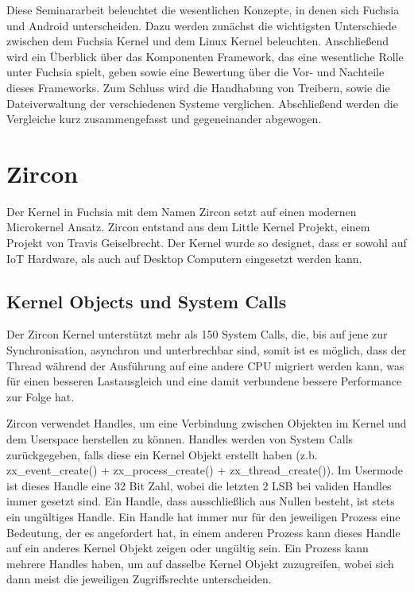 \documentclass[a4paper]{scrartcl}
\begin{document}
Diese Seminararbeit beleuchtet die wesentlichen Konzepte, in denen sich Fuchsia und Android unterscheiden. Dazu werden zunächst die wichtigsten Unterschiede zwischen dem Fuchsia Kernel und dem Linux Kernel beleuchten. Anschließend wird ein Überblick über das Komponenten Framework, das eine wesentliche Rolle unter Fuchsia spielt, geben sowie eine Bewertung über die Vor- und Nachteile dieses Frameworks. Zum Schluss wird die Handhabung von Treibern, sowie die Dateiverwaltung der verschiedenen Systeme verglichen. Abschließend werden die Vergleiche kurz zusammengefasst und gegeneinander abgewogen.
\section{Zircon}
Der Kernel in Fuchsia mit dem Namen Zircon setzt auf einen modernen Microkernel Ansatz. Zircon entstand aus dem Little Kernel Projekt, einem Projekt von Travis Geiselbrecht. Der Kernel wurde so designet, dass er sowohl auf IoT Hardware, als auch auf Desktop Computern eingesetzt werden kann. \cite{DaveAltavilla.30.Juni2019}
\subsection{Kernel Objects und System Calls}
Der Zircon Kernel unterstützt mehr als 150 System Calls, die, bis auf jene zur Synchronisation, asynchron und unterbrechbar sind, \cite{Fuchsia.Zircon.Systemcalls} somit ist es möglich, dass der Thread während der Ausführung auf eine andere CPU migriert werden kann, was für einen besseren Lastausgleich und eine damit verbundene bessere Performance zur Folge hat.

Zircon verwendet Handles, um eine Verbindung zwischen Objekten im Kernel und dem Userspace herstellen zu können. Handles werden von System Calls zurückgegeben, falls diese ein Kernel Objekt erstellt haben (z.b. zx\_event\_create() + zx\_process\_create() + zx\_thread\_create()). Im Usermode ist dieses Handle eine 32 Bit Zahl, wobei die letzten 2 LSB bei validen Handles immer gesetzt sind. Ein Handle, dass ausschließlich aus Nullen besteht, ist stets ein ungültiges Handle. Ein Handle hat immer nur für den jeweiligen Prozess eine Bedeutung, der es angefordert hat, in einem anderen Prozess kann dieses Handle auf ein anderes Kernel Objekt zeigen oder ungültig sein. Ein Prozess kann mehrere Handles haben, um auf dasselbe Kernel Objekt zuzugreifen, wobei sich dann meist die jeweiligen Zugriffsrechte unterscheiden. \cite{Fuchsia.Zircon.Handles}
\end{document}
